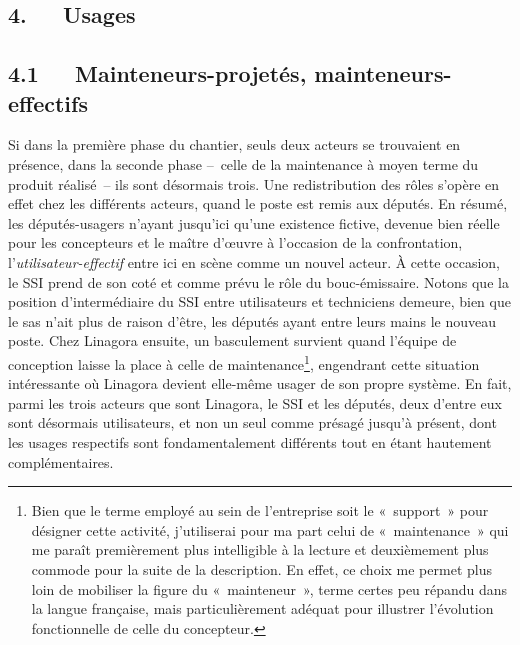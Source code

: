 \documentclass{FramateX}
\begin{document}
\begin{refsection}
\section*{4.~~~Usages}
{}

\subsection*{4.1~~~Mainteneurs-projetés, mainteneurs-effectifs}
{}


Si dans la première phase du chantier, seuls deux acteurs se trouvaient
en présence, dans la seconde phase –~celle de la maintenance à moyen
terme du produit réalisé~– ils sont désormais trois. Une redistribution
des rôles s'opère en effet chez les différents acteurs, quand le poste
est remis aux députés. En résumé, les députés-usagers n'ayant jusqu'ici
qu'une existence fictive, devenue bien réelle pour les concepteurs et
le maître d'œuvre à l'occasion de la confrontation,
l'\textit{utilisateur-effectif }entre ici en scène comme un nouvel
acteur. À cette occasion, le SSI prend de son coté et comme prévu le
rôle du bouc-émissaire. Notons que la position d'intermédiaire du SSI
entre utilisateurs et techniciens demeure, bien que le sas n'ait plus
de raison d'être, les députés ayant entre leurs mains le nouveau poste.
Chez Linagora ensuite, un basculement survient quand l'équipe de
conception laisse la place à celle de maintenance\footnote{Bien que le
terme employé au sein de l'entreprise soit le «~support~» pour désigner
cette activité, j'utiliserai pour ma part celui de «~maintenance~» qui
me paraît premièrement plus intelligible à la lecture et deuxièmement
plus commode pour la suite de la description. En effet, ce choix me
permet plus loin de mobiliser la figure du «~mainteneur~», terme certes
peu répandu dans la langue française, mais particulièrement adéquat
pour illustrer l'évolution fonctionnelle de celle du concepteur.},
engendrant cette situation intéressante où Linagora devient elle-même
usager de son propre système. En fait, parmi les trois acteurs que sont
Linagora, le SSI et les députés, deux d'entre eux sont désormais
utilisateurs, et non un seul comme présagé jusqu'à présent, dont les
usages respectifs sont fondamentalement différents tout en étant
hautement complémentaires. 



\end{refsection}
\end{document}
